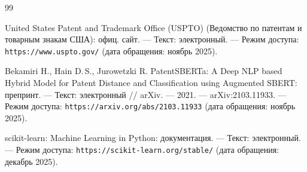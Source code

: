 \documentclass{article}
\begin{document}
\newpage
\begin{thebibliography}{99}

United States Patent and Trademark Office (USPTO) (Ведомство по патентам и товарным знакам США): офиц. сайт. --- Текст: электронный. --- Режим доступа: \texttt{https://www.uspto.gov/} (дата обращения: ноябрь 2025).

Bekamiri H., Hain D.\,S., Jurowetzki R. PatentSBERTa: A Deep NLP based Hybrid Model for Patent Distance and Classification using Augmented SBERT: препринт. --- Текст: электронный // arXiv. --- 2021. --- arXiv:2103.11933. --- Режим доступа: \texttt{https://arxiv.org/abs/2103.11933} (дата обращения: ноябрь 2025).

scikit-learn: Machine Learning in Python: документация. --- Текст: электронный. --- Режим доступа: \texttt{https://scikit-learn.org/stable/} (дата обращения: декабрь 2025).

\end{thebibliography}
\end{document}
